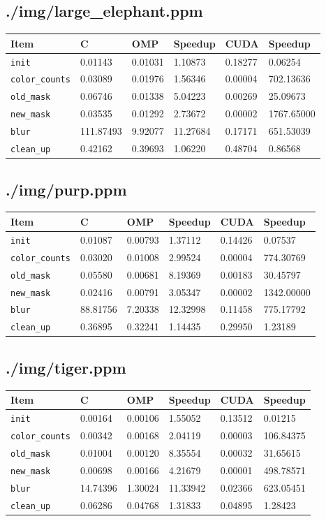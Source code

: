 \documentclass[12pt]{article}
\begin{document}
\subsection{./img/large_elephant.ppm}
\begin{tabular}{l|l|l|l|l|l}
    Item & C & OMP & Speedup & CUDA & Speedup
\\  \hline
    \texttt{init} & 0.01143 & 0.01031 & 1.10873 & 0.18277 & 0.06254
\\  \texttt{color_counts} & 0.03089 & 0.01976 & 1.56346 & 0.00004 & 702.13636
\\  \texttt{old_mask} & 0.06746 & 0.01338 & 5.04223 & 0.00269 & 25.09673
\\  \texttt{new_mask} & 0.03535 & 0.01292 & 2.73672 & 0.00002 & 1767.65000
\\  \texttt{blur} & 111.87493 & 9.92077 & 11.27684 & 0.17171 & 651.53039
\\  \texttt{clean_up} & 0.42162 & 0.39693 & 1.06220 & 0.48704 & 0.86568
\end{tabular}
\subsection{./img/purp.ppm}
\begin{tabular}{l|l|l|l|l|l}
    Item & C & OMP & Speedup & CUDA & Speedup
\\  \hline
    \texttt{init} & 0.01087 & 0.00793 & 1.37112 & 0.14426 & 0.07537
\\  \texttt{color_counts} & 0.03020 & 0.01008 & 2.99524 & 0.00004 & 774.30769
\\  \texttt{old_mask} & 0.05580 & 0.00681 & 8.19369 & 0.00183 & 30.45797
\\  \texttt{new_mask} & 0.02416 & 0.00791 & 3.05347 & 0.00002 & 1342.00000
\\  \texttt{blur} & 88.81756 & 7.20338 & 12.32998 & 0.11458 & 775.17792
\\  \texttt{clean_up} & 0.36895 & 0.32241 & 1.14435 & 0.29950 & 1.23189
\end{tabular}
\subsection{./img/tiger.ppm}
\begin{tabular}{l|l|l|l|l|l}
    Item & C & OMP & Speedup & CUDA & Speedup
\\  \hline
    \texttt{init} & 0.00164 & 0.00106 & 1.55052 & 0.13512 & 0.01215
\\  \texttt{color_counts} & 0.00342 & 0.00168 & 2.04119 & 0.00003 & 106.84375
\\  \texttt{old_mask} & 0.01004 & 0.00120 & 8.35554 & 0.00032 & 31.65615
\\  \texttt{new_mask} & 0.00698 & 0.00166 & 4.21679 & 0.00001 & 498.78571
\\  \texttt{blur} & 14.74396 & 1.30024 & 11.33942 & 0.02366 & 623.05451
\\  \texttt{clean_up} & 0.06286 & 0.04768 & 1.31833 & 0.04895 & 1.28423
\end{tabular}
\end{document}
